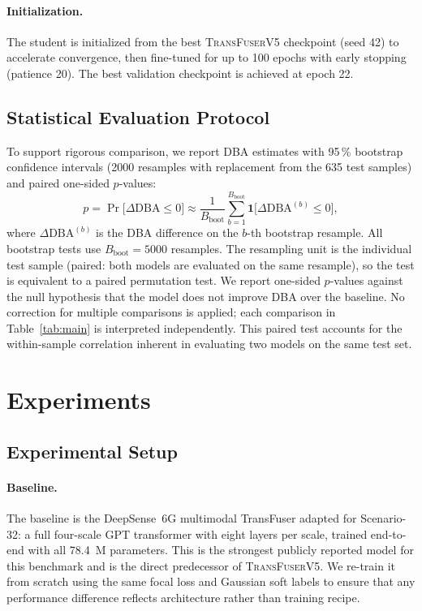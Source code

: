 \documentclass[journal,10pt,twoside]{IEEEtran}
\newcommand{\DBA}{\mathrm{DBA}}
\newcommand{\ours}{\textsc{TransFuserV5}}
\begin{document}
\paragraph{Initialization.}
The student is initialized from the best \ours{} checkpoint (seed 42) to
accelerate convergence, then fine-tuned for up to 100 epochs with early
stopping (patience 20). The best validation checkpoint is achieved at
epoch 22.

\subsection{Statistical Evaluation Protocol}

To support rigorous comparison, we report DBA estimates with 95\,\% bootstrap
confidence intervals (2000 resamples with replacement from the 635 test samples)
and paired one-sided $p$-values:
\begin{equation}
  p = \Pr\bigl[\Delta\DBA \leq 0\bigr]
    \approx \frac{1}{B_{\text{boot}}}
      \sum_{b=1}^{B_{\text{boot}}} \mathbf{1}\bigl[\Delta\DBA^{(b)} \leq 0\bigr],
\end{equation}
where $\Delta\DBA^{(b)}$ is the DBA difference on the $b$-th bootstrap resample.
All bootstrap tests use $B_{\text{boot}} = 5000$ resamples. The resampling unit
is the individual test sample (paired: both models are evaluated on the same
resample), so the test is equivalent to a paired permutation test. We report
one-sided $p$-values against the null hypothesis that the model does not improve
DBA over the baseline. No correction for multiple comparisons is applied; each
comparison in Table~\ref{tab:main} is interpreted independently.
This paired test accounts for the within-sample correlation inherent in
evaluating two models on the same test set.

\section{Experiments}
\label{sec:experiments}

\subsection{Experimental Setup}

\paragraph{Baseline.}
The baseline is the DeepSense~6G multimodal TransFuser
\cite{deepsense_top2022,prakash2021transfuser} adapted for Scenario-32:
a full four-scale GPT transformer with eight layers per scale, trained
end-to-end with all 78.4~M parameters. This is the strongest publicly
reported model for this benchmark and is the direct predecessor of \ours{}.
We re-train it from scratch using the same focal loss and Gaussian soft labels
to ensure that any performance difference reflects architecture rather than
training recipe.
\end{document}
